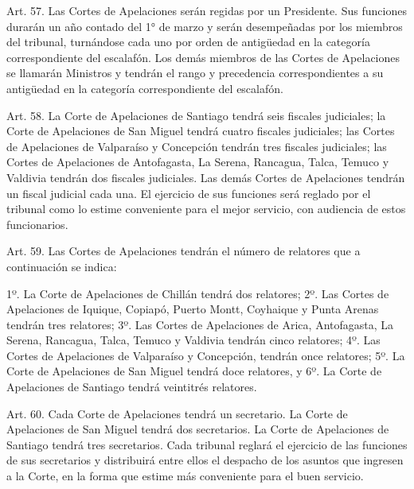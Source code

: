     Art. 57. Las Cortes de Apelaciones serán regidas por un Presidente. Sus funciones durarán un año contado del 1° de marzo y serán desempeñadas por los miembros del tribunal, turnándose cada uno por orden de antigüedad en la categoría correspondiente del escalafón.
    Los demás miembros de las Cortes de Apelaciones se llamarán Ministros y tendrán el rango y precedencia correspondientes a su antigüedad en la categoría correspondiente del escalafón.



    Art. 58. La Corte de Apelaciones de Santiago tendrá seis fiscales judiciales; la Corte de Apelaciones de San Miguel tendrá cuatro fiscales judiciales; las Cortes de Apelaciones de Valparaíso y Concepción tendrán tres fiscales judiciales; las Cortes de Apelaciones de Antofagasta, La Serena, Rancagua, Talca, Temuco y Valdivia tendrán dos fiscales judiciales. Las demás Cortes de Apelaciones tendrán un fiscal judicial cada una. El ejercicio de sus funciones será reglado por el tribunal como lo estime conveniente para el mejor servicio, con audiencia de estos funcionarios.


    Art. 59. Las Cortes de Apelaciones tendrán el número de relatores que a continuación se indica:

    1º. La Corte de Apelaciones de Chillán tendrá dos relatores;
    2º. Las Cortes de Apelaciones de Iquique, Copiapó, Puerto Montt, Coyhaique y Punta Arenas tendrán tres relatores;
    3º. Las Cortes de Apelaciones de Arica, Antofagasta, La Serena, Rancagua, Talca, Temuco y Valdivia tendrán cinco relatores;
    4º. Las Cortes de Apelaciones de Valparaíso y Concepción, tendrán once relatores;
    5º. La Corte de Apelaciones de San Miguel tendrá doce relatores, y
    6º. La Corte de Apelaciones de Santiago tendrá veintitrés relatores.



    Art. 60. Cada Corte de Apelaciones tendrá un secretario.
    La Corte de Apelaciones de San Miguel tendrá dos secretarios. La Corte de Apelaciones de Santiago tendrá tres secretarios. Cada tribunal reglará el ejercicio de las funciones de sus secretarios y distribuirá entre ellos el despacho de los asuntos que ingresen a la Corte, en la forma que estime más conveniente para el buen servicio.


